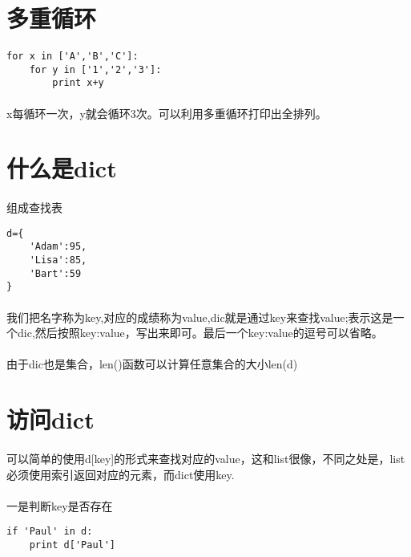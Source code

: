 \documentclass{article}
\begin{document}
\begin{CJK}{UTF8}{gbsn}
\section{多重循环}
\paragraph{}
\begin{verbatim}
for x in ['A','B','C']:
    for y in ['1','2','3']:
        print x+y
\end{verbatim}
\paragraph{}
x每循环一次，y就会循环3次。可以利用多重循环打印出全排列。        
\section{什么是dict}
\paragraph{}
组成查找表
\begin{verbatim}
d={
    'Adam':95,
    'Lisa':85,
    'Bart':59
}
\end{verbatim}
\paragraph{}
我们把名字称为key,对应的成绩称为value,dic就是通过key来查找value;{}表示这是一个dic,然后按照key:value，写出来即可。最后一个key:value的逗号可以省略。
\paragraph{}
由于dic也是集合，len()函数可以计算任意集合的大小len(d)
\section{访问dict}
\paragraph{}
可以简单的使用d[key]的形式来查找对应的value，这和list很像，不同之处是，list必须使用索引返回对应的元素，而dict使用key.
\paragraph{}
一是判断key是否存在
\begin{verbatim}
if 'Paul' in d:
    print d['Paul']
\end{verbatim}

\end{CJK}
\end{document}
